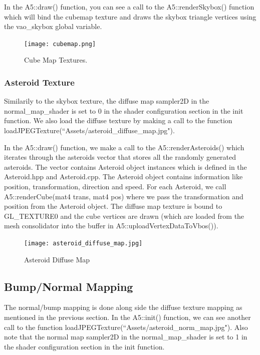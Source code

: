 \documentclass {article}
\begin{document}
In the A5::draw() function, you can see a call to the A5::renderSkybox() function which will bind the cubemap texture and draws the skybox triangle vertices using the vao\_skybox global variable.

\begin{figure}[h]
\begin{center}
	\texttt{[image: cubemap.png]}
	\caption{Cube Map Textures.}
  \label{fig:cubemap}
\end{center}
\end{figure}

\subsubsection{Asteroid Texture}
\hspace{0.5cm} Similarily to the skybox texture, the diffuse map sampler2D in the normal\_map\_shader is set to 0 in the shader configuration section in the init function. We also load the diffuse texture by making a call to the function loadJPEGTexture(``Assets/asteroid\_diffuse\_map.jpg").

In the A5::draw() function, we make a call to the A5::renderAsteroids() which iterates through the asteroids vector that stores all the randomly generated asteroids. The vector contains Asteroid object instances which is defined in the Asteroid.hpp and Asteroid.cpp. The Asteroid object contains information like position, transformation, direction and speed.
For each Asteroid, we call A5::renderCube(mat4 trans, mat4 pos) where we pass the transformation and position from the Asteroid object. The diffuse map texture is bound to GL\_TEXTURE0 and the cube vertices are drawn (which are loaded from the mesh consolidator into the buffer in A5::uploadVertexDataToVbos()).

\begin{figure}[h]
\begin{center}
	\texttt{[image: asteroid\_diffuse\_map.jpg]}
	\caption{Asteroid Diffuse Map}
  \label{fig:diffmap}
\end{center}
\end{figure}

\subsection{Bump/Normal Mapping}

\hspace{0.5cm} The normal/bump mapping is done along side the diffuse texture mapping as mentioned in the previous section. In the A5::init() function, we can see another call to the function 
loadJPEGTexture(``Assets/asteroid\_norm\_map.jpg"). Also note that the normal map sampler2D in the normal\_map\_shader is set to 1 in the shader configuration section in the init function.
\end{document}
